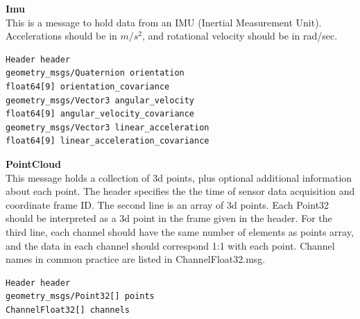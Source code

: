 \documentclass[twoside]{article}
\begin{document}
\textbf{Imu} \\
This is a message to hold data from an IMU (Inertial Measurement Unit). Accelerations should be in $m/s^2$, and rotational velocity should be in rad/sec.

\begin{verbatim}
Header header
geometry_msgs/Quaternion orientation
float64[9] orientation_covariance
geometry_msgs/Vector3 angular_velocity
float64[9] angular_velocity_covariance
geometry_msgs/Vector3 linear_acceleration
float64[9] linear_acceleration_covariance
\end{verbatim}

\textbf{PointCloud} \\
This message holds a collection of 3d points, plus optional additional information about each point. The header specifies the the time of sensor data acquisition and coordinate frame ID. The second line is an array of 3d points. Each Point32 should be interpreted as a 3d point in the frame given in the header. For the third line, each channel should have the same number of elements as points array, and the data in each channel should correspond 1:1 with each point. Channel names in common practice are listed in ChannelFloat32.msg.
\begin{verbatim}
Header header
geometry_msgs/Point32[] points
ChannelFloat32[] channels
\end{verbatim}
\end{document}
